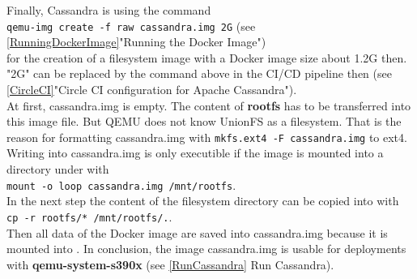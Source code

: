 Finally, Cassandra is using the command \\
\lstinline!qemu-img create -f raw cassandra.img 2G! (see \ref{RunningDockerImage}"Running the Docker Image") \\
for the creation of a filesystem image with a Docker image size about 1.2G then. "2G" can be replaced by the command above in the CI/CD pipeline then (see \ref{CircleCI}"Circle CI configuration for Apache Cassandra"). \\
At first, cassandra.img is empty. The content of \textbf{rootfs} has to be transferred into this image file. But QEMU does not know UnionFS as a filesystem. That is the reason for formatting cassandra.img with \lstinline!mkfs.ext4 -F cassandra.img! to ext4. Writing into cassandra.img is only executible if the image is mounted into a directory under  with \\
\lstinline!mount -o loop cassandra.img /mnt/rootfs!. \\ 
In the next step the content of the filesystem directory can be copied into  with \\ 
\lstinline!cp -r rootfs/* /mnt/rootfs/.!. \\ 
Then all data of the Docker image are saved into cassandra.img because it is mounted into . In conclusion, the image cassandra.img is usable for deployments with \textbf{qemu-system-s390x} (see \ref{RunCassandra} Run Cassandra). 